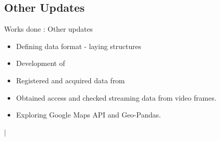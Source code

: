 \documentclass{beamer}
\newcommand{\link}[2]{\href{#1}{\textit{\color{blue}{#2}}}}%
\begin{document}
	\subsection{Other Updates}
	\begin{frame}{Works done : Other updates}
		\begin{itemize}
			\item Defining data format - laying structures \link{https://github.com/Project-Dragon-Fly/mock-servers/blob/main/data\_format.md}{visit here}
			\item Development of \link{https://github.com/Project-Dragon-Fly/backend-server}{boilerplate codes}
			\item Registered and acquired data from \link{https://www.aicitychallenge.org/}{NVIDIA AI City Challenge}
			\item Obtained access and checked streaming data from video frames.
			\item Exploring Google Maps API and Geo-Pandas.
		\end{itemize}
		\begin{center}
			\link{https://github.com/Project-Dragon-Fly}{GitHub Organization} $|$ \link{https://drive.google.
				com/drive/folders/1GbQ1L1mfY97nh3NXE4Iyz\_e2gIwvmH0V?usp=sharing}{Shared Google Drive}
		\end{center}
	\end{frame}

\end{document}
